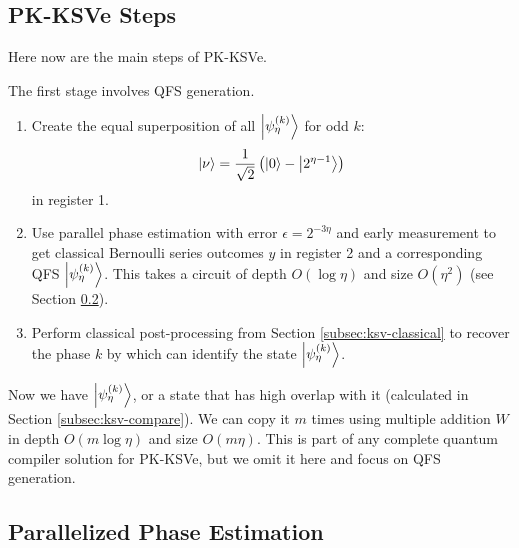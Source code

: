 \subsection{PK-KSVe Steps}
\label{subsec:ksv-steps}

Here now are the main steps of PK-KSVe.

The first stage involves QFS generation.

\begin{enumerate}
\item Create the equal superposition of all $\left\vert{\psi_{\eta}^{(k)}}\right\rangle$ for odd $k$:
\begin{equation}
\left\vert{\nu}\right\rangle = \frac{1}{\sqrt{2}} \left( \left\vert{0}\right\rangle - \left\vert{2^{{\eta}-1}}\right\rangle \right)
\end{equation}
in register 1.
\item Use parallel phase estimation with error $\epsilon = 2^{-3\eta}$ and early
measurement to get classical Bernoulli series outcomes $y$ in register 2
and a corresponding QFS $\left\vert{\psi_{\eta}^{(k)}}\right\rangle$. This takes a circuit of
depth $O(\log {\eta})$ and size $O({\eta}^2)$ (see Section \ref{subsec:ppe}).
\item Perform classical post-processing from Section \ref{subsec:ksv-classical} to
recover the phase $k$ by which can identify the state $\left\vert{\psi_{\eta}^{(k)}}\right\rangle$.
\end{enumerate}

Now we have $\left\vert{\psi_{\eta}^{(k)}}\right\rangle$, or a state that has high overlap with it
(calculated in Section \ref{subsec:ksv-compare}).
We can copy it $m$ times using multiple addition $W$ in depth
$O(m \log {\eta})$ and size $O(m\eta)$. This is part of any complete
quantum compiler solution for PK-KSVe, but we omit it here and
focus on QFS generation.

\subsection{Parallelized Phase Estimation}
\label{subsec:ppe}

